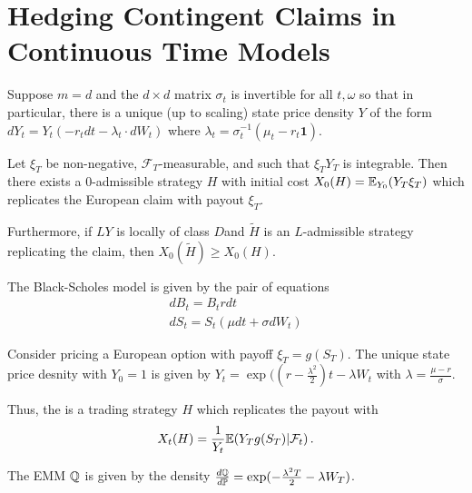 \section{Hedging Contingent Claims in Continuous Time Models}
\label{sec:hedg-cont-claims}

\begin{thm}
  \label{sec:hedg-cont-claims-1}
  Suppose $m=d$ and the $d \times d$ matrix $\sigma_{t}$ is invertible
  for all $t, \omega$ so that in particular, there is a unique (up to
  scaling) state price density $Y$ of the form $dY_{t} = Y_{t}(-r_{t}
  dt - \lambda_{t} \cdot dW_{t})$ where $\lambda_{t} =
  \sigma_{t}^{-1}(\mu_{t} - r_{t} \mathbf{1})$.

  Let $\xi_{T}$ be non-negative, $\mathcal{F}_{T}$-measurable, and
  such that $\xi_{T} Y_{T}$ is integrable.  Then there exists a
  $0$-admissible strategy $H$ with initial cost $X_{0}(H) = \E{Y_{T}
    \xi_{T}}{Y_{0}}$ which replicates the European claim with payout
  $\xi_{T}$.

  Furthermore, if $LY$ is locally of class $D$and $\tilde H$ is an
  $L$-admissible strategy replicating the claim, then $X_{0}(\tilde H)
  \geq X_{0}(H)$.
\end{thm}

\begin{defn}
  \label{sec:hedg-cont-claims-2}
  The Black-Scholes model is given by the pair of equations
  \begin{align}
    \label{eq:24}
    dB_{t} = B_{t} r dt \\
    dS_{t} = S_{t}(\mu dt + \sigma dW_{t})
  \end{align}

  Consider pricing a European option with payoff $\xi_{T} = g(S_{T})$.
  The unique state price desnity with $Y_{0} = 1$ is given by $Y_{t} =
  \exp((r - \frac{\lambda^{2}}{2})t - \lambda W_{t}$ with $\lambda =
  \frac{\mu - r}{\sigma}$.


  Thus, the is a trading strategy $H$ which replicates the payout with
  \begin{align}
    \label{eq:25}
    X_{t}(H) = \frac{1}{Y_{t}} \E{Y_{T} g(S_{T}) | \mathcal{F}_{t}}.
  \end{align}

  The EMM $\Q$ is given by the density $\frac{d\Q}{d\Prob} =
  \exp(-\frac{\lambda^{2} T}{2} - \lambda W_{T})$.
\end{defn}

